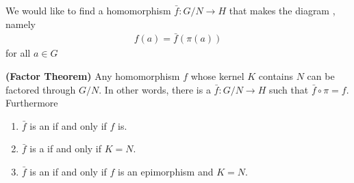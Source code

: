 \documentclass{article}
\newcommand{\bfs}[1]{\textbf{({#1}) }}
\begin{document}
We would like to find a homomorphism $\bar{f}: G / N \rightarrow H$ that makes the diagram , namely
\begin{align*}
f(a)=\bar{f}(\pi(a))
\end{align*}
for all $a \in G$
\begin{thma}\bfs{Factor Theorem}\label{thm:aondca}
Any homomorphism $f$ whose kernel $K$ contains $N$ can be factored through $G / N$. In other words, there is a  $\bar{f}: G / N \rightarrow H$ such that $\bar{f} \circ \pi=f$. Furthermore
\begin{enumerate}
    \item $\bar{f}$ is an  if and only if $f$ is.
    \item $\bar{f}$ is a  if and only if $K=N$.
    \item $\bar{f}$ is an  if and only if $f$ is an epimorphism and $K=N$.
\end{enumerate}
\end{thma} 
\end{document}
